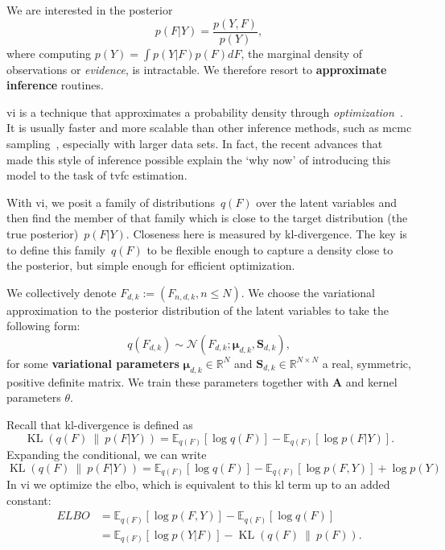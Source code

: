 We are interested in the posterior
\begin{equation}
  p(F|Y) = \frac{p(Y,F)}{p(Y)},
\end{equation}
where computing $p(Y) = \int p(Y|F)p(F)dF$, the marginal density of observations or \emph{evidence}, is intractable.
We therefore resort to \textbf{approximate inference} routines.

\Gls{vi} is a technique that approximates a probability density through \emph{optimization}~\parencite{Jordan1999, Hoffman2015, Blei2017}.
It is usually faster and more scalable than other inference methods, such as \gls{mcmc} sampling~\parencite[as used in e.g.][]{Fox2011}, especially with larger data sets.
In fact, the recent advances that made this style of inference possible explain the `why now' of introducing this model to the task of \gls{tvfc} estimation.

With \gls{vi}, we posit a family of distributions~$q(F)$ over the latent variables and then find the member of that family which is close to the target distribution (the true posterior)~$p(F|Y)$.
Closeness here is measured by \gls{kl-divergence}.
The key is to define this family~$q(F)$ to be flexible enough to capture a density close to the posterior, but simple enough for efficient optimization.

We collectively denote $F_{d,k} := (F_{n,d,k}, n \leq N)$.
We choose the variational approximation to the posterior distribution of the latent variables to take the following form:
\begin{equation}
  q(F_{d,k}) \sim \mathcal{N}(F_{d,k};\boldsymbol{\mu}_{d,k}, \mathbf{S}_{d,k}),
\end{equation}
for some \textbf{variational parameters} $\boldsymbol{\mu}_{d,k} \in \mathbb{R}^N$ and $\mathbf{S}_{d,k} \in \mathbb{R}^{N \times N}$ a real, symmetric, positive definite matrix.
We train these parameters together with $\mathbf{A}$ and kernel parameters $\theta$.

Recall that \gls{kl-divergence} is defined as
\begin{equation}
  \operatorname{KL}(q(F)~\|~p(F | Y)) = \mathbb{E}_{q(F)}[\log q(F)] - \mathbb{E}_{q(F)}[\log p(F | Y)].
\end{equation}
Expanding the conditional, we can write
\begin{equation}
  \operatorname{KL}(q(F)~\|~p(F | Y)) = \mathbb{E}_{q(F)}[\log q(F)] - \mathbb{E}_{q(F)}[\log p(F, Y)] + \log p(Y)
\end{equation}
In \gls{vi} we optimize the \gls{elbo}, which is equivalent to this \gls{kl} term up to an added constant:
\begin{equation} \label{eq1}
  \begin{split}
    ELBO & = \mathbb{E}_{q(F)}[\log p(F, Y)] - \mathbb{E}_{q(F)}[\log q(F)] \\
    & = \mathbb{E}_{q(F)}[\log p(Y|F)] - \operatorname{KL}(q(F)~\|~p(F)).
  \end{split}
\end{equation}

